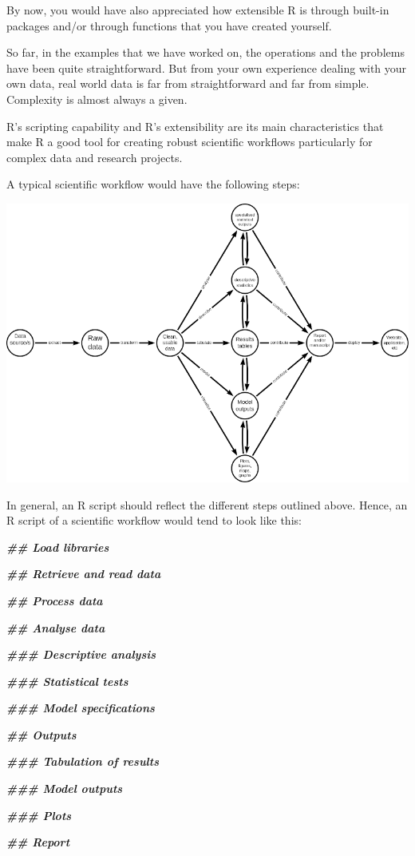 \documentclass[
  12pt,
]{book}
\newenvironment{Shaded}{\begin{snugshade}}{\end{snugshade}}
\newcommand{\DocumentationTok}[1]{\textcolor[rgb]{0.56,0.35,0.01}{\textbf{\textit{#1}}}}
\begin{document}
By now, you would have also appreciated how extensible R is through built-in packages and/or through functions that you have created yourself.

So far, in the examples that we have worked on, the operations and the problems have been quite straightforward. But from your own experience dealing with your own data, real world data is far from straightforward and far from simple. Complexity is almost always a given.

R's scripting capability and R's extensibility are its main characteristics that make R a good tool for creating robust scientific workflows particularly for complex data and research projects.

A typical scientific workflow would have the following steps:

\begin{center}\includegraphics[width=11.11in]{images/scientific-workflow} \end{center}

In general, an R script should reflect the different steps outlined above. Hence, an R script of a scientific workflow would tend to look like this:

\begin{Shaded}
\begin{Highlighting}[]
\DocumentationTok{\#\# Load libraries}


\DocumentationTok{\#\# Retrieve and read data}


\DocumentationTok{\#\# Process data}


\DocumentationTok{\#\# Analyse data}

\DocumentationTok{\#\#\# Descriptive analysis}

\DocumentationTok{\#\#\# Statistical tests}

\DocumentationTok{\#\#\# Model specifications}


\DocumentationTok{\#\# Outputs}

\DocumentationTok{\#\#\# Tabulation of results}

\DocumentationTok{\#\#\# Model outputs}

\DocumentationTok{\#\#\# Plots}


\DocumentationTok{\#\# Report}

\end{Highlighting}
\end{Shaded}
\end{document}
